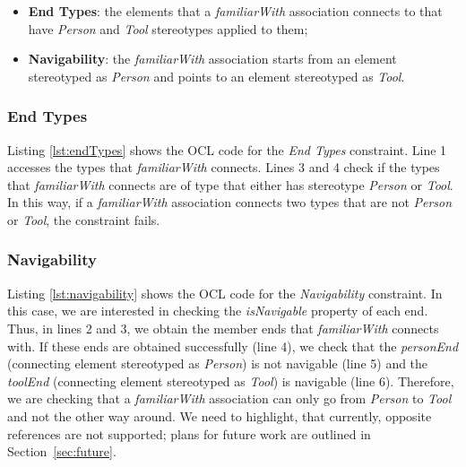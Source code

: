 \begin{itemize}
	\item \textbf{End Types}: the elements that a \emph{familiarWith} association connects to that have \emph{Person} and \emph{Tool} stereotypes applied to them;
	\item \textbf{Navigability}: the \emph{familiarWith} association starts from an element stereotyped as \emph{Person} and points to an element stereotyped as \emph{Tool}.
\end{itemize}

\subsubsection{End Types}
Listing \ref{lst:endTypes} shows the OCL code for the \emph{End Types} constraint. Line 1 accesses the types that \emph{familiarWith} connects. Lines 3 and 4 check if the types that \emph{familiarWith} connects are of type that either has stereotype \emph{Person} or \emph{Tool}. In this way, if a \emph{familiarWith} association connects two types that are not \emph{Person} or \emph{Tool}, the constraint fails.




\subsubsection{Navigability}
Listing \ref{lst:navigability} shows the OCL code for the \emph{Navigability} constraint. In this case, we are interested in checking the \emph{isNavigable} property of each end. Thus, in lines 2 and 3, we obtain the member ends that \emph{familiarWith} connects with. If these ends are obtained successfully (line 4), we check that the \emph{personEnd} (connecting element stereotyped as \emph{Person}) is not navigable (line 5) and the \emph{toolEnd} (connecting element stereotyped as \emph{Tool}) is navigable (line 6). Therefore, we are checking that a \emph{familiarWith} association can only go from \emph{Person} to \emph{Tool} and not the other way around. We need to highlight, that currently, opposite references are not supported; plans for future work are outlined in Section~\ref{sec:future}.

